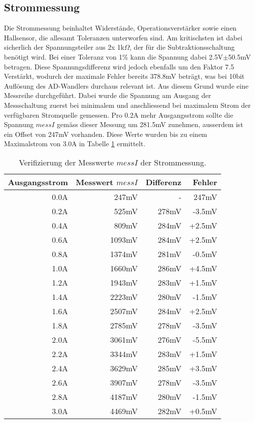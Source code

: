 \subsection{Strommessung}\label{subsec_messi}
Die Strommessung beinhaltet Widerstände, Operationsverstärker sowie einen Hallsensor, die allesamt Toleranzen unterworfen sind. Am kritischsten ist dabei sicherlich der Spannungsteiler aus 2x 1k$\Omega$, der für die Subtraktionsschaltung benötigt wird. Bei einer Toleranz von 1\% kann die Spannung dabei 2.5V$\pm$50.5mV betragen. Diese Spannungsdifferenz wird jedoch ebenfalls um den Faktor 7.5 Verstärkt, wodurch der maximale Fehler bereits 378.8mV beträgt, was bei 10bit Auflösung des AD-Wandlers durchaus relevant ist. \newline
Aus diesem Grund wurde eine Messreihe durchgeführt. Dabei wurde die Spannung am Ausgang der Messschaltung zuerst bei minimalem und anschliessend bei maximalem Strom der verfügbaren Stromquelle gemessen. Pro 0.2A mehr Ausgangsstrom sollte die Spannung $messI$ gemäss dieser Messung um 281.5mV zunehmen, ausserdem ist ein Offset von 247mV vorhanden. Diese Werte wurden bis zu einem Maximalstrom von 3.0A in Tabelle \ref{tab:messI} ermittelt.
\begin{table}%
\centering
\begin{tabular}{|r|r|r|r|}
	\hline
	\textbf{Ausgangsstrom} & \textbf{Messwert $messI$} & \textbf{Differenz} & \textbf{Fehler} \\ \hline
	0.0A & 247mV & - & 247mV \\ \hline
	0.2A & 525mV & 278mV & -3.5mV \\ \hline
	0.4A & 809mV & 284mV & +2.5mV \\ \hline
	0.6A & 1093mV & 284mV & +2.5mV \\ \hline
	0.8A & 1374mV & 281mV & -0.5mV \\ \hline
	1.0A & 1660mV & 286mV & +4.5mV \\ \hline
	1.2A & 1943mV & 283mV & +1.5mV \\ \hline
	1.4A & 2223mV & 280mV & -1.5mV \\ \hline
	1.6A & 2507mV & 284mV & +2.5mV \\ \hline
	1.8A & 2785mV & 278mV & -3.5mV \\ \hline
	2.0A & 3061mV & 276mV & -5.5mV \\ \hline
	2.2A & 3344mV & 283mV & +1.5mV \\ \hline
	2.4A & 3629mV & 285mV & +3.5mV \\ \hline
	2.6A & 3907mV & 278mV & -3.5mV \\ \hline
	2.8A & 4187mV & 280mV & -1.5mV \\ \hline
	3.0A & 4469mV & 282mV & +0.5mV \\ \hline
\end{tabular}
\caption{Verifizierung der Messwerte $messI$ der Strommessung.}
\label{tab:messI}
\end{table}
